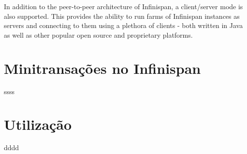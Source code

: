 \documentclass[11pt,twoside,a4paper]{book}
\renewcommand{\chaptermark}[1]{\markboth{\MakeUppercase{#1}}{}}
\begin{document}
In addition to the peer-to-peer architecture of Infinispan, a client/server mode is also supported.  This provides the 
ability to run farms of Infinispan instances as servers and connecting to them using a plethora of clients - both written 
in Java as well as other popular open source and proprietary platforms.

\section{Minitransações no Infinispan}
\label{sec:mt_infinispan}
ssss

\section{Utilização}
\label{sec:utilizacao}
dddd

\renewcommand{\chaptermark}[1]{\markboth{\MakeUppercase{\appendixname\ \thechapter}} {\MakeUppercase{#1}} }
\fancyhead[RE,LO]{}
\appendix

\backmatter \singlespacing   %
\end{document}
